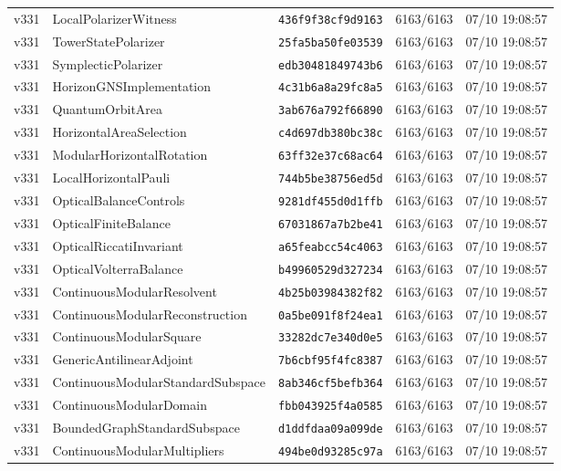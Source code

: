 \documentclass[11pt]{article}
\theoremstyle{definition}\newtheorem{deriv}{Derivation}
\begin{document}
{\begin{longtable}{@{}lllll@{}}
v331 & LocalPolarizerWitness & \texttt{436f9f38cf9d9163} & 6163/6163 & 07/10 19:08:57 \\
v331 & TowerStatePolarizer & \texttt{25fa5ba50fe03539} & 6163/6163 & 07/10 19:08:57 \\
v331 & SymplecticPolarizer & \texttt{edb30481849743b6} & 6163/6163 & 07/10 19:08:57 \\
v331 & HorizonGNSImplementation & \texttt{4c31b6a8a29fc8a5} & 6163/6163 & 07/10 19:08:57 \\
v331 & QuantumOrbitArea & \texttt{3ab676a792f66890} & 6163/6163 & 07/10 19:08:57 \\
v331 & HorizontalAreaSelection & \texttt{c4d697db380bc38c} & 6163/6163 & 07/10 19:08:57 \\
v331 & ModularHorizontalRotation & \texttt{63ff32e37c68ac64} & 6163/6163 & 07/10 19:08:57 \\
v331 & LocalHorizontalPauli & \texttt{744b5be38756ed5d} & 6163/6163 & 07/10 19:08:57 \\
v331 & OpticalBalanceControls & \texttt{9281df455d0d1ffb} & 6163/6163 & 07/10 19:08:57 \\
v331 & OpticalFiniteBalance & \texttt{67031867a7b2be41} & 6163/6163 & 07/10 19:08:57 \\
v331 & OpticalRiccatiInvariant & \texttt{a65feabcc54c4063} & 6163/6163 & 07/10 19:08:57 \\
v331 & OpticalVolterraBalance & \texttt{b49960529d327234} & 6163/6163 & 07/10 19:08:57 \\
v331 & ContinuousModularResolvent & \texttt{4b25b03984382f82} & 6163/6163 & 07/10 19:08:57 \\
v331 & ContinuousModularReconstruction & \texttt{0a5be091f8f24ea1} & 6163/6163 & 07/10 19:08:57 \\
v331 & ContinuousModularSquare & \texttt{33282dc7e340d0e5} & 6163/6163 & 07/10 19:08:57 \\
v331 & GenericAntilinearAdjoint & \texttt{7b6cbf95f4fc8387} & 6163/6163 & 07/10 19:08:57 \\
v331 & ContinuousModularStandardSubspace & \texttt{8ab346cf5befb364} & 6163/6163 & 07/10 19:08:57 \\
v331 & ContinuousModularDomain & \texttt{fbb043925f4a0585} & 6163/6163 & 07/10 19:08:57 \\
v331 & BoundedGraphStandardSubspace & \texttt{d1ddfdaa09a099de} & 6163/6163 & 07/10 19:08:57 \\
v331 & ContinuousModularMultipliers & \texttt{494be0d93285c97a} & 6163/6163 & 07/10 19:08:57 \\

\end{longtable}}
\end{document}
